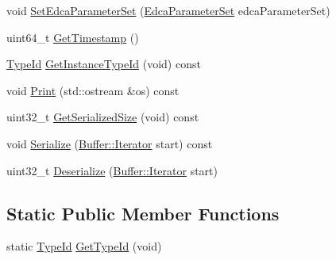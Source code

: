 \begin{DoxyCompactItemize}
\item 
void \hyperlink{classns3_1_1MgtProbeResponseHeader_ab369952f14a08b3e8ee2a38572df0db5}{Set\+Edca\+Parameter\+Set} (\hyperlink{classns3_1_1EdcaParameterSet}{Edca\+Parameter\+Set} edca\+Parameter\+Set)
\item 
uint64\+\_\+t \hyperlink{classns3_1_1MgtProbeResponseHeader_a110ad374e1b29014ebd808f1a8f2bb01}{Get\+Timestamp} ()
\item 
\hyperlink{classns3_1_1TypeId}{Type\+Id} \hyperlink{classns3_1_1MgtProbeResponseHeader_ab8a48caf34c5e7c0d614d5e4d7b2dd8c}{Get\+Instance\+Type\+Id} (void) const 
\item 
void \hyperlink{classns3_1_1MgtProbeResponseHeader_a95e0b5dcac2ae29489fe5c8ff9a6de57}{Print} (std\+::ostream \&os) const 
\item 
uint32\+\_\+t \hyperlink{classns3_1_1MgtProbeResponseHeader_a43cf3f2aa46f2497a593633345d076f8}{Get\+Serialized\+Size} (void) const 
\item 
void \hyperlink{classns3_1_1MgtProbeResponseHeader_a721188a210bcccb82dcb65ec389a264d}{Serialize} (\hyperlink{classns3_1_1Buffer_1_1Iterator}{Buffer\+::\+Iterator} start) const 
\item 
uint32\+\_\+t \hyperlink{classns3_1_1MgtProbeResponseHeader_acf693465957d06ea7f1a06881052b71a}{Deserialize} (\hyperlink{classns3_1_1Buffer_1_1Iterator}{Buffer\+::\+Iterator} start)
\end{DoxyCompactItemize}
\subsection*{Static Public Member Functions}
\begin{DoxyCompactItemize}
\item 
static \hyperlink{classns3_1_1TypeId}{Type\+Id} \hyperlink{classns3_1_1MgtProbeResponseHeader_a63a7dd863be607df3c4a4cdffe68fc1e}{Get\+Type\+Id} (void)
\end{DoxyCompactItemize}
